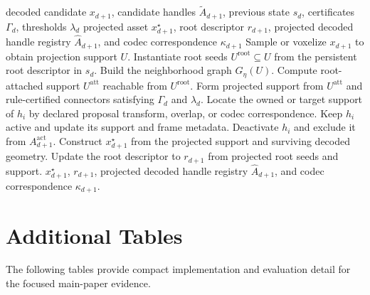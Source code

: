 \documentclass[acmtog,anonymous,review]{acmart}
\begin{document}
\begin{algorithm}[t]
  \caption{State-stabilizing admissibility projection.}
  \label{alg:admissibility-projection}
  \begin{algorithmic}[1]
    \Require decoded candidate $x_{d+1}$, candidate handles $\widetilde A_{d+1}$, previous state $s_d$, certificates $\Gamma_d$, thresholds $\lambda_d$
    \Ensure projected asset $x^\star_{d+1}$, root descriptor $r_{d+1}$, projected decoded handle registry $\widehat A_{d+1}$, and codec correspondence $\kappa_{d+1}$
    \State Sample or voxelize $x_{d+1}$ to obtain projection support $U$.
    \State Instantiate root seeds $U^{\mathrm{root}}\subseteq U$ from the persistent root descriptor in $s_d$.
    \State Build the neighborhood graph $G_\eta(U)$.
    \State Compute root-attached support $U^{\mathrm{att}}$ reachable from $U^{\mathrm{root}}$.
    \State Form projected support from $U^{\mathrm{att}}$ and rule-certified connectors satisfying $\Gamma_d$ and $\lambda_d$.
      \State Locate the owned or target support of $h_i$ by declared proposal transform, overlap, or codec correspondence.
        \State Keep $h_i$ active and update its support and frame metadata.
      \Else
        \State Deactivate $h_i$ and exclude it from $A_{d+1}^{\mathrm{act}}$.
      \EndIf
    \EndFor
    \State Construct $x^\star_{d+1}$ from the projected support and surviving decoded geometry.
    \State Update the root descriptor to $r_{d+1}$ from projected root seeds and support.
    \State \Return $x^\star_{d+1}$, $r_{d+1}$, projected decoded handle registry $\widehat A_{d+1}$, and codec correspondence $\kappa_{d+1}$.
  \end{algorithmic}
\end{algorithm}



\section{Additional Tables}
\label{app:moved-main-tables}
The following tables provide compact implementation and evaluation detail for the focused main-paper evidence.
\end{document}
